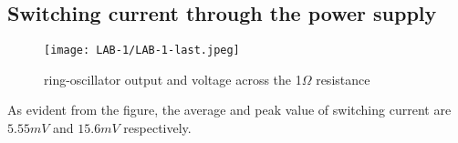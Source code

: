 \documentclass[12pt]{article}
\begin{document}
   \subsection{Switching current through the power supply}
     
      \begin{figure}[H]
          \centering
          \texttt{[image: LAB-1/LAB-1-last.jpeg]}
          \caption{ring-oscillator output and voltage across the 1$\Omega$ resistance}
      \end{figure}
      
      As evident from the figure, the average and peak value of switching current are $5.55mV$ and $15.6mV$ respectively.
\end{document}
